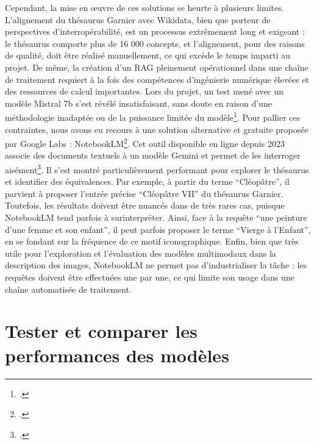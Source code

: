 Cependant, la mise en œuvre de ces solutions se heurte à plusieurs limites. L’alignement du thésaurus Garnier avec Wikidata, bien que porteur de perspectives d’interropérabilité, est un processus extrêmement long et exigeant : le thésaurus comporte plus de 16 000 concepts, et l’alignement, pour des raisons de qualité, doit être réalisé manuellement, ce qui excède le temps imparti au projet. De même, la création d’un RAG pleinement opérationnel dans une chaîne de traitement requiert à la fois des compétences d’ingénierie numérique élevées et des ressources de calcul importantes. Lors du projet, un test mené avec un modèle Mistral 7b s’est révélé insatisfaisant, sans doute en raison d’une méthodologie inadaptée ou de la puissance limitée du modèle\footcite{mistralaiMistral7B2023}.
Pour pallier ces contraintes, nous avons eu recours à une solution alternative et gratuite proposée par Google Labs : NotebookLM\footcite{googlelabsGoogleNotebookLM}. Cet outil disponible en ligne depuis 2023 associe des documents textuels à un modèle Gemini et permet de les interroger aisément\footcite{martinGoogleNotebookLM2023}. Il s’est montré particulièrement performant pour explorer le thésaurus et identifier des équivalences. Par exemple, à partir du terme “Cléopâtre”, il parvient à proposer l’entrée précise “Cléopâtre VII” du thésaurus Garnier. Toutefois, les résultats doivent être nuancés dans de très rares cas, puisque NotebookLM tend parfois à surinterpréter. Ainsi, face à la requête “une peinture d’une femme et son enfant”, il peut parfois proposer le terme “Vierge à l’Enfant”, en se fondant sur la fréquence de ce motif iconographique. Enfin, bien que très utile pour l’exploration et l’évaluation des modèles multimodaux dans la description des images, NotebookLM ne permet pas d’industrialiser la tâche : les requêtes doivent être effectuées une par une, ce qui limite son usage dans une chaîne automatisée de traitement.

\section[Tests de performances]{Tester et comparer les performances des modèles}

